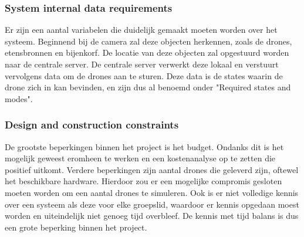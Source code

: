 \subsubsection*{System internal data requirements}
Er zijn een aantal variabelen die duidelijk gemaakt moeten worden over het systeem. Beginnend bij de camera zal deze objecten herkennen, zoals de drones, etensbronnen en bijenkorf. De locatie van deze objecten zal opgestuurd worden naar de centrale server. De centrale server verwerkt deze lokaal en verstuurt vervolgens data om de drones aan te sturen. Deze data is de states waarin de drone zich in kan bevinden, en zijn dus al benoemd onder "Required states and modes".

\subsubsection*{Design and construction constraints}
De grootste beperkingen binnen het project is het budget. Ondanks dit is het mogelijk geweest eromheen te werken en een kostenanalyse op te zetten die positief uitkomt. Verdere beperkingen zijn aantal drones die geleverd zijn, oftewel het beschikbare hardware. Hierdoor zou er een mogelijke compromis gesloten moeten worden om een aantal drones te simuleren. Ook is er niet volledige kennis over een systeem als deze voor elke groepslid, waardoor er kennis opgedaan moest worden en uiteindelijk niet genoeg tijd overbleef. De kennis met tijd balans is dus een grote beperking binnen het project.
